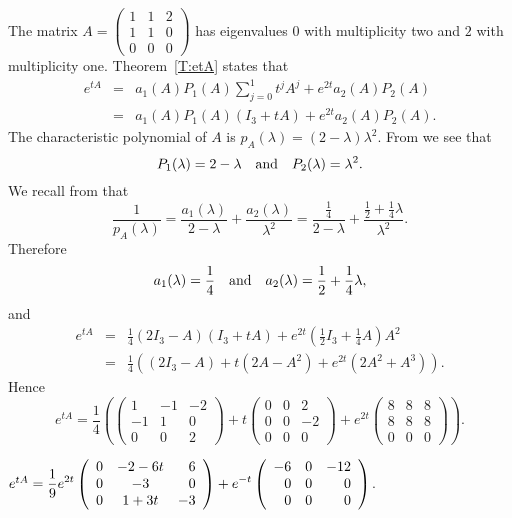 \documentclass{ximera}
\begin{document}
\soln The matrix 
$A = \left(\begin{array}{rrr} 1 & 1 & 2\\ 1 & 1 & 0 \\ 0 & 0 & 0
\end{array}\right)$ has eigenvalues $0$ with multiplicity two and $2$ 
with multiplicity one. Theorem~\ref{T:etA} states that 
\begin{eqnarray*}
e^{tA} & = & a_1(A)P_1(A)\sum_{j=0}^1t^jA^j + e^{2t}a_2(A)P_2(A)\\
 & = & a_1(A)P_1(A)(I_3+tA) + e^{2t}a_2(A)P_2(A).
\end{eqnarray*}
The characteristic polynomial of $A$ is $p_A(\lambda) =(2-\lambda)\lambda^2$.
From  we see that
\[
P_1(\lambda) = 2-\lambda \quad\mbox{and}\quad P_2(\lambda) = \lambda^2.
\]
We recall from  that 
\[
\frac{1}{p_A(\lambda)} = \frac{a_1(\lambda)}{2-\lambda} + 
\frac{a_2(\lambda)}{\lambda^2} = \frac{\frac{1}{4}}{2-\lambda}
+ \frac{\frac{1}{2}+\frac{1}{4}\lambda}{\lambda^2}.
\]
Therefore
\[
a_1(\lambda) = \frac{1}{4} \quad\mbox{and}\quad a_2(\lambda) = \frac{1}{2}+\frac{1}{4}\lambda,
\]
and
\begin{eqnarray*}
e^{tA} & = & \frac{1}{4}(2I_3-A)(I_3+tA) + 
e^{2t}\left(\frac{1}{2}I_3+\frac{1}{4}A\right)A^2\\
& = & \frac{1}{4}\left((2I_3-A)+t(2A-A^2)+e^{2t}(2A^2+A^3)\right).
\end{eqnarray*}
Hence
\[
e^{tA}= \frac{1}{4}\left(\left(\begin{array}{rrr} 1 & -1 & -2\\ -1 & 1 & 0 
\\ 0 & 0 & 2\end{array}\right)+t\left(\begin{array}{rrr} 0 & 0 & 2\\ 0 & 0 & -2
\\ 0 & 0 & 0 \end{array}\right)+e^{2t}\left(\begin{array}{rrr} 8 & 8 & 8\\ 
8 & 8 & 8 \\ 0 & 0 & 0\end{array}\right)\right).
\]

\newpage
{} \ans $e^{tA}= \displaystyle\frac{1}{9}e^{2t}\left(\begin{array}{rcr} 
0 & -2-6t & 6\\ 0 & -3 & 0\\ 0 & 1+3t & -3\end{array}\right) 
+e^{-t}\left(\begin{array}{rrr} -6 & 0 & -12\\  0 & 0 & 0 \\ 0 & 0 & 0 
\end{array}\right)$.
\end{document}

